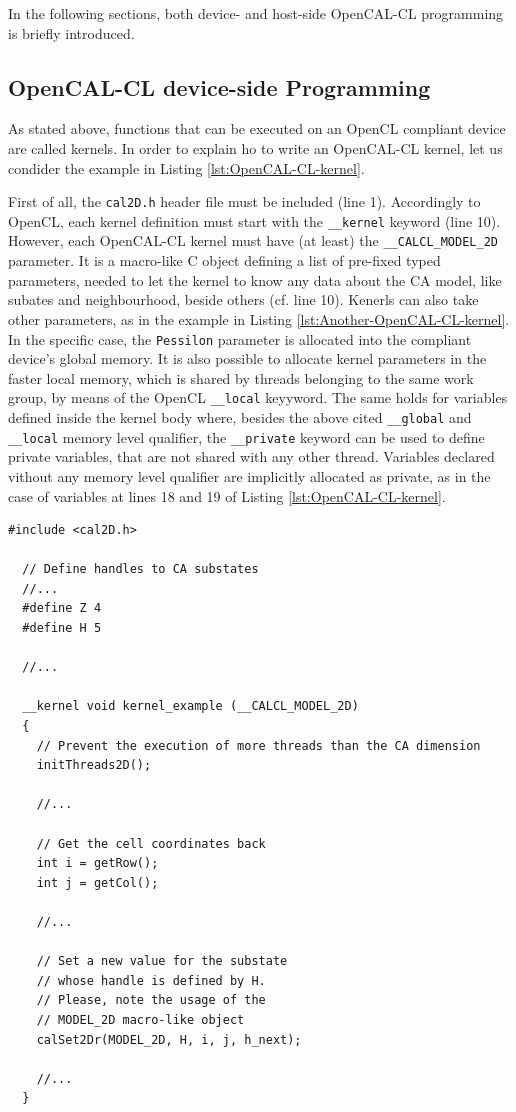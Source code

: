 In the following sections, both device- and host-side OpenCAL-CL
programming is briefly introduced.


\subsection{OpenCAL-CL device-side Programming}

As stated above, functions that can be executed on an OpenCL compliant
device are called kernels. In order to explain ho to write an
OpenCAL-CL kernel, let us condider the example in Listing
\ref{lst:OpenCAL-CL-kernel}.

First of all, the \verb'cal2D.h' header file must be included (line
1). Accordingly to OpenCL, each kernel definition must start with the
\verb'__kernel' keyword (line 10). However, each OpenCAL-CL kernel
must have (at least) the \verb'__CALCL_MODEL_2D' parameter. It is a
macro-like C object defining a list of pre-fixed typed parameters,
needed to let the kernel to know any data about the CA model, like
subates and neighbourhood, beside others (cf. line 10). Kenerls can
also take other parameters, as in the example in Listing
\ref{lst:Another-OpenCAL-CL-kernel}. In the specific case, the
\verb'Pessilon' parameter is allocated into the compliant device's
global memory. It is also possible to allocate kernel parameters in
the faster local memory, which is shared by threads belonging to the
same work group, by means of the OpenCL \verb'__local' keyyword. The
same holds for variables defined inside the kernel body where, besides
the above cited \verb'__global' and \verb'__local' memory level
qualifier, the \verb'__private' keyword can be used to define private
variables, that are not shared with any other thread. Variables
declared vithout any memory level qualifier are implicitly allocated
as private, as in the case of variables at lines 18 and 19 of Listing
\ref{lst:OpenCAL-CL-kernel}.

\begin{lstlisting}[float,floatplacement=H, label=lst:OpenCAL-CL-kernel, caption=Example of OpenCAL-CL kernel.] 
  #include <cal2D.h>

  // Define handles to CA substates
  //...
  #define Z 4
  #define H 5

  //...
  
  __kernel void kernel_example (__CALCL_MODEL_2D)
  {
    // Prevent the execution of more threads than the CA dimension
    initThreads2D();

    //...

    // Get the cell coordinates back
    int i = getRow();
    int j = getCol();

    //...

    // Set a new value for the substate
    // whose handle is defined by H.
    // Please, note the usage of the
    // MODEL_2D macro-like object
    calSet2Dr(MODEL_2D, H, i, j, h_next);
    
    //...
  }
\end{lstlisting}

